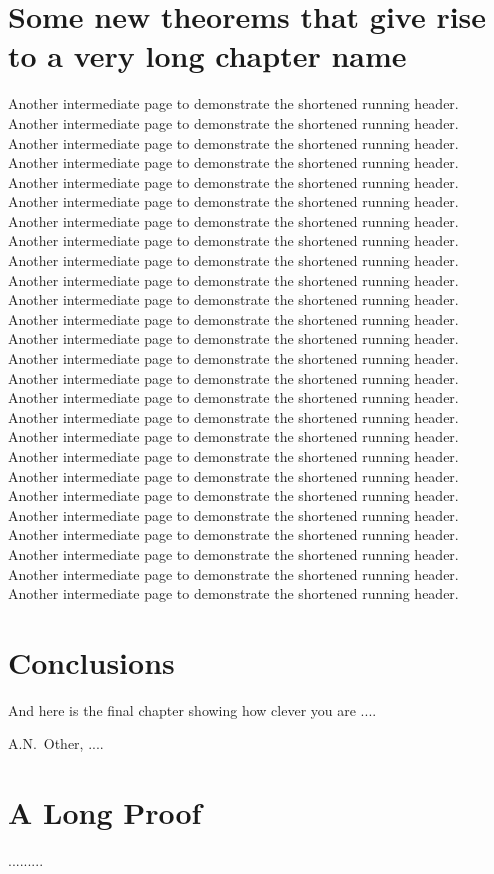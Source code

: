 \documentclass[12pt,MSc,twoside]{muthesis}
\begin{document}
\chapter{Some new theorems that give rise to a very long chapter name}
Another intermediate page to demonstrate the shortened running header.
Another intermediate page to demonstrate the shortened running header.
Another intermediate page to demonstrate the shortened running header.
Another intermediate page to demonstrate the shortened running header.
Another intermediate page to demonstrate the shortened running header.
Another intermediate page to demonstrate the shortened running header.
Another intermediate page to demonstrate the shortened running header.
Another intermediate page to demonstrate the shortened running header.
Another intermediate page to demonstrate the shortened running header.
Another intermediate page to demonstrate the shortened running header.
Another intermediate page to demonstrate the shortened running header.
Another intermediate page to demonstrate the shortened running header.
Another intermediate page to demonstrate the shortened running header.
Another intermediate page to demonstrate the shortened running header.
Another intermediate page to demonstrate the shortened running header.
Another intermediate page to demonstrate the shortened running header.
Another intermediate page to demonstrate the shortened running header.
Another intermediate page to demonstrate the shortened running header.
Another intermediate page to demonstrate the shortened running header.
Another intermediate page to demonstrate the shortened running header.
Another intermediate page to demonstrate the shortened running header.
Another intermediate page to demonstrate the shortened running header.
Another intermediate page to demonstrate the shortened running header.
Another intermediate page to demonstrate the shortened running header.
Another intermediate page to demonstrate the shortened running header.
Another intermediate page to demonstrate the shortened running header.

\chapter{Conclusions}
And here is the final chapter showing how clever you are ....


\begin{thebibliography}{999}
 A.N.~Other, ....
\end{thebibliography}

\appendix
\chapter{A Long Proof}
.........

\end{document}
